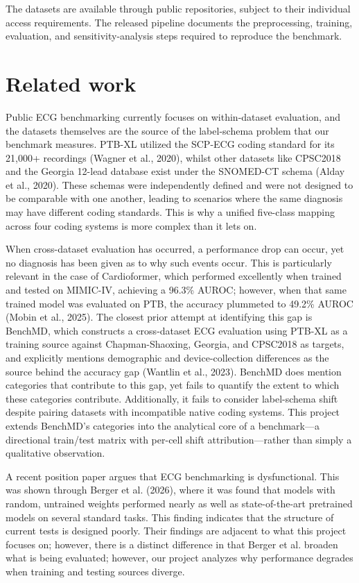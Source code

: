 \documentclass{article}
\begin{document}
The datasets are available through public repositories, subject to their individual access requirements. The released pipeline documents the preprocessing, training, evaluation, and sensitivity-analysis steps required to reproduce the benchmark.

\section{Related work}

Public ECG benchmarking currently focuses on within-dataset evaluation, and the datasets themselves are the source of the label-schema problem that our benchmark measures. PTB-XL utilized the SCP-ECG coding standard for its 21,000+ recordings (Wagner et al., 2020), whilst other datasets like CPSC2018 and the Georgia 12-lead database exist under the SNOMED-CT schema (Alday et al., 2020). These schemas were independently defined and were not designed to be comparable with one another, leading to scenarios where the same diagnosis may have different coding standards. This is why a unified five-class mapping across four coding systems is more complex than it lets on.

When cross-dataset evaluation has occurred, a performance drop can occur, yet no diagnosis has been given as to why such events occur. This is particularly relevant in the case of Cardioformer, which performed excellently when trained and tested on MIMIC-IV, achieving a 96.3\% AUROC; however, when that same trained model was evaluated on PTB, the accuracy plummeted to 49.2\% AUROC (Mobin et al., 2025). The closest prior attempt at identifying this gap is BenchMD, which constructs a cross-dataset ECG evaluation using PTB-XL as a training source against Chapman-Shaoxing, Georgia, and CPSC2018 as targets, and explicitly mentions demographic and device-collection differences as the source behind the accuracy gap (Wantlin et al., 2023). BenchMD does mention categories that contribute to this gap, yet fails to quantify the extent to which these categories contribute. Additionally, it fails to consider label-schema shift despite pairing datasets with incompatible native coding systems. This project extends BenchMD's categories into the analytical core of a benchmark---a directional train/test matrix with per-cell shift attribution---rather than simply a qualitative observation.

A recent position paper argues that ECG benchmarking is dysfunctional. This was shown through Berger et al. (2026), where it was found that models with random, untrained weights performed nearly as well as state-of-the-art pretrained models on several standard tasks. This finding indicates that the structure of current tests is designed poorly. Their findings are adjacent to what this project focuses on; however, there is a distinct difference in that Berger et al. broaden what is being evaluated; however, our project analyzes why performance degrades when training and testing sources diverge.
\end{document}
